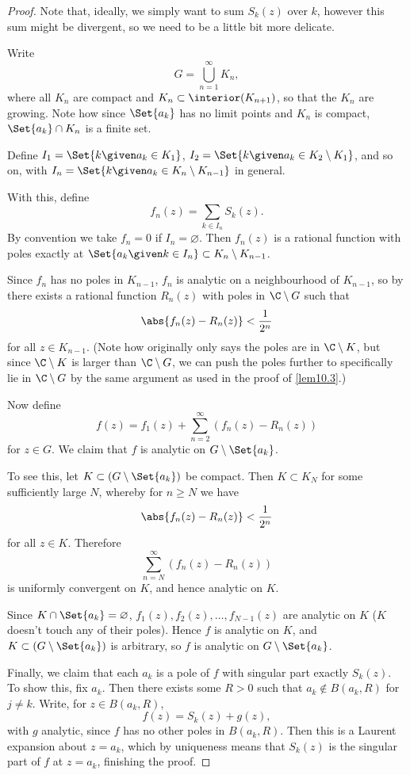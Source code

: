 \begin{proof}
	Note that, ideally, we simply want to sum $S_k(z)$ over $k$, however this sum might be divergent, so we need to be a little bit more delicate.

	Write
	\[
		G = \bigcup_{n = 1}^\infty K_n,
	\]
	where all $K_n$ are compact and $K_n \subset \interior(K_{n + 1})$, so that the $K_n$ are growing.
	Note how since $\Set{a_k}$ has no limit points and $K_n$ is compact, $\Set{a_k} \cap K_n$ is a finite set.

	Define $I_1 = \Set{k \given a_k \in K_1}$, $I_2 = \Set{k \given a_k \in K_2 \setminus K_1}$, and so on, with $I_n = \Set{k \given a_k \in K_n \setminus K_{n - 1}}$ in general.

	With this, define
	\[
		f_n(z) = \sum_{k \in I_n} S_k(z).
	\]
	By convention we take $f_n = 0$ if $I_n = \varnothing$.
	Then $f_n(z)$ is a rational function with poles exactly at $\Set{a_k \given k \in I_n} \subset K_n \setminus K_{n - 1}$.

	Since $f_n$ has no poles in $K_{n - 1}$, $f_n$ is analytic on a neighbourhood of $K_{n - 1}$, so by  there exists a rational function $R_n(z)$ with poles in $\C \setminus G$ such that
	\[
		\abs{f_n(z) - R_n(z)} < \frac{1}{2^n}
	\]
	for all $z \in K_{n - 1}$.
	(Note how originally  only says the poles are in $\C \setminus K$, but since $\C \setminus K$ is larger than $\C \setminus G$, we can push the poles further to specifically lie in $\C \setminus G$ by the same argument as used in the proof of \autoref{lem10.3}.)

	Now define
	\[
		f(z) = f_1(z) + \sum_{n = 2}^\infty (f_n(z) - R_n(z))
	\]
	for $z \in G$.
	We claim that $f$ is analytic on $G \setminus \Set{a_k}$.

	To see this, let $K \subset (G \setminus \Set{a_k})$ be compact.
	Then $K \subset K_N$ for some sufficiently large $N$, whereby for $n \geq N$ we have
	\[
		\abs{f_n(z) - R_n(z)} < \frac{1}{2^n}
	\]
	for all $z \in K$.
	Therefore
	\[
		\sum_{n = N}^\infty (f_n(z) - R_n(z))
	\]
	is uniformly convergent on $K$, and hence analytic on $K$.

	Since $K \cap \Set{a_k} = \varnothing$, $f_1(z), f_2(z), \dots, f_{N - 1}(z)$ are analytic on $K$ ($K$ doesn't touch any of their poles).
	Hence $f$ is analytic on $K$, and $K \subset (G \setminus \Set{a_k})$ is arbitrary, so $f$ is analytic on $G \setminus \Set{a_k}$.

	Finally, we claim that each $a_k$ is a pole of $f$ with singular part exactly $S_k(z)$.
	To show this, fix $a_k$.
	Then there exists some $R > 0$ such that $a_k \not\in B(a_k, R)$ for $j \neq k$.
	Write, for $z \in B(a_k, R)$,
	\[
		f(z) = S_k(z) + g(z),
	\]
	with $g$ analytic, since $f$ has no other poles in $B(a_k, R)$.
	Then this is a Laurent expansion about $z = a_k$, which by uniqueness means that $S_k(z)$ is the singular part of $f$ at $z = a_k$, finishing the proof.
\end{proof}

